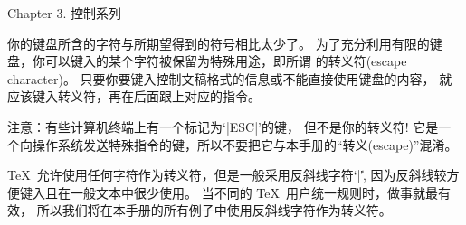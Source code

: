 


\beginchapter Chapter 3. 控制系列


\1你的键盘所含的字符与所期望得到的符号相比太少了。%
为了充分利用有限的键盘，你可以键入的某个字符被保留为特殊用途，即所谓%
的转义符(escape cha\-racter)。%
只要你要键入控制文稿格式的信息或不能直接使用键盘的内容，
就应该键入转义符，再在后面跟上对应的指令。

注意：有些计算机终端上有一个标记为`|ESC|'的键，
但不是你的转义符!
它是一个向操作系统发送特殊指令的键，所以不要把它与本手册的``转义(escape)''混淆。

\TeX\ 允许使用任何字符作为转义符，但是一般采用反斜线字符`|\|',
因为反斜线较方便键入且在一般文本中很少使用。%
当不同的 \TeX\ 用户统一规则时，做事就最有效，
所以我们将在本手册的所有例子中使用反斜线字符作为转义符。

